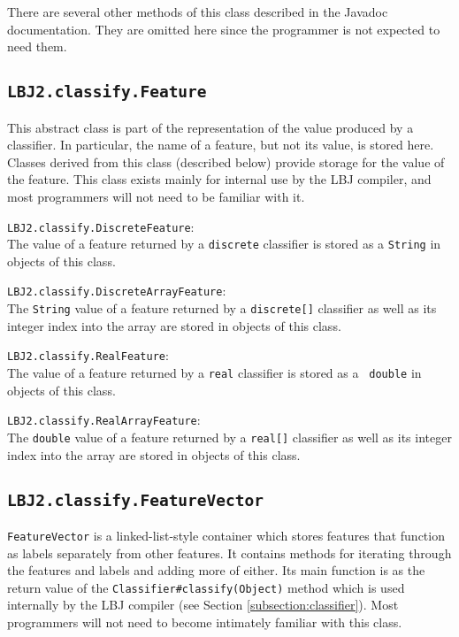 There are several other methods of this class described in the Javadoc
documentation.  They are omitted here since the programmer is not expected to
need them.

\subsection{{\tt LBJ2.classify.Feature}} \label{subsection:feature}
This abstract class is part of the representation of the value produced by a
classifier.  In particular, the name of a feature, but not its value, is
stored here.  Classes derived from this class (described below) provide
storage for the value of the feature.  This class exists mainly for internal
use by the LBJ compiler, and most programmers will not need to be familiar
with it.

\begin{list}{}{}
\item[{\tt LBJ2.classify.DiscreteFeature}:] ~\\
The value of a feature returned by a {\tt discrete} classifier is stored as a
{\tt String} in objects of this class.

\item[{\tt LBJ2.classify.DiscreteArrayFeature}:] ~\\
The {\tt String} value of a feature returned by a {\tt discrete[]} classifier
as well as its integer index into the array are stored in objects of this
class.

\item[{\tt LBJ2.classify.RealFeature}:] ~\\
The value of a feature returned by a {\tt real} classifier is stored as a {\tt
double} in objects of this class.

\item[{\tt LBJ2.classify.RealArrayFeature}:] ~\\
The {\tt double} value of a feature returned by a {\tt real[]} classifier as
well as its integer index into the array are stored in objects of this class.
\end{list}

\subsection{{\tt LBJ2.classify.FeatureVector}}\label{subsection:featureVector}
{\tt FeatureVector} is a linked-list-style container which stores features
that function as labels separately from other features.  It contains methods
for iterating through the features and labels and adding more of either.  Its
main function is as the return value of the {\tt Classifier\#classify(Object)}
method which is used internally by the LBJ compiler (see Section
\ref{subsection:classifier}).  Most programmers will not need to become
intimately familiar with this class.

